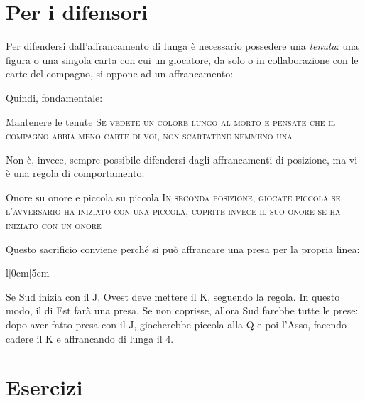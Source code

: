 \documentclass[../corsofiori.tex]{subfiles}
\begin{document}
\section{Per i difensori}

Per difendersi dall'affrancamento di lunga è necessario possedere una \emph{tenuta}: una figura o una singola carta con cui un giocatore, da solo o in
collaborazione con le carte del compagno, si oppone ad un affrancamento:

\newpage

Quindi, fondamentale:

\medskip

\begin{regola}{Mantenere le tenute}
    \textsc{Se vedete un colore lungo al morto e pensate che il compagno abbia meno carte di voi, non scartatene nemmeno una}
\end{regola}
\medskip

Non è, invece, sempre possibile difendersi dagli affrancamenti di posizione, ma vi è una regola di comportamento:

\begin{regola}{Onore su onore e piccola su piccola}
    \textsc{In seconda posizione, giocate piccola se l'avversario ha iniziato con una piccola, coprite invece il suo
        onore se ha iniziato con un onore}
\end{regola}

Questo sacrificio conviene perché si può affrancare una presa per la propria linea:

\begin{wraptable}[7]{l}[0cm]{5cm}
\end{wraptable}

Se Sud inizia con il J, Ovest deve mettere il K, seguendo la regola. In questo modo, il \Ten di Est farà una presa. Se
non coprisse, allora Sud farebbe tutte le prese: dopo aver fatto presa con il J, giocherebbe piccola alla Q e poi
l'Asso, facendo cadere il K e affrancando di lunga il 4.



\clearpage
\section*{Esercizi}

\bigskip
\end{document}
